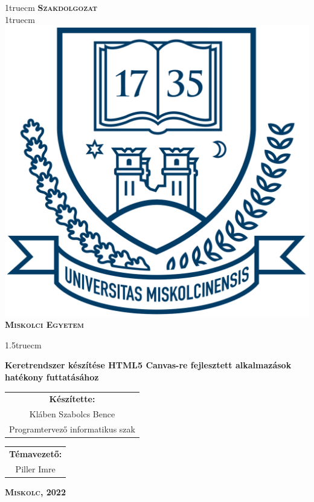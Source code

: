 \pagestyle{empty} %

{\large
\begin{center}
\vglue 1truecm
\textbf{\huge\textsc{Szakdolgozat}}\\
\vglue 1truecm
\includegraphics[width=4.8truecm, height=4truecm]{images/me_logo.png}\\
\textbf{\textsc{Miskolci Egyetem}}
\end{center}}

\vglue 1.5truecm %

{\LARGE
\begin{center}
\textbf{Keretrendszer készítése HTML5 Canvas-re fejlesztett alkalmazások hatékony futtatásához}
\end{center}}

\vspace*{2.5truecm}
{\large
\begin{center}
\begin{tabular}{c}
\textbf{Készítette:}\\
Kláben Szabolcs Bence\\
Programtervező informatikus szak
\end{tabular}
\end{center}
\begin{center}
\begin{tabular}{c}
\textbf{Témavezető:}\\
Piller Imre
\end{tabular}
\end{center}}
\vfill
{\large
\begin{center}
\textbf{\textsc{Miskolc, 2022}}
\end{center}}

\newpage
